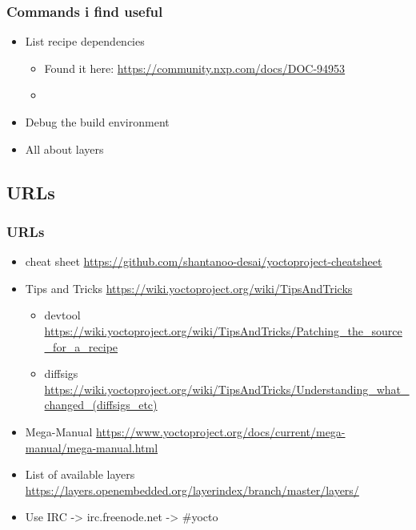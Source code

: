 
\begin{frame}
\frametitle{Commands i find useful}
  \begin{itemize}
     \item List recipe dependencies
        \begin{itemize}
           \item Found it here: \url{https://community.nxp.com/docs/DOC-94953}
           \item {}
        \end{itemize}
     \item Debug the build environment 
     \item All about layers 
  \end{itemize}
\end{frame}


\subsection{URLs}

\begin{frame}
\frametitle{URLs}
  \begin{itemize}
     \item cheat sheet \url{https://github.com/shantanoo-desai/yoctoproject-cheatsheet}
     \item Tips and Tricks \url{https://wiki.yoctoproject.org/wiki/TipsAndTricks}
        \begin{itemize}
           \item devtool \url{https://wiki.yoctoproject.org/wiki/TipsAndTricks/Patching_the_source_for_a_recipe}
           \item diffsigs \url{https://wiki.yoctoproject.org/wiki/TipsAndTricks/Understanding_what_changed_(diffsigs_etc)}
        \end{itemize}
     \item Mega-Manual \url{https://www.yoctoproject.org/docs/current/mega-manual/mega-manual.html}
     \item List of available layers \url{https://layers.openembedded.org/layerindex/branch/master/layers/}
     \item Use IRC -> irc.freenode.net -> \#yocto
  \end{itemize}
\end{frame}

